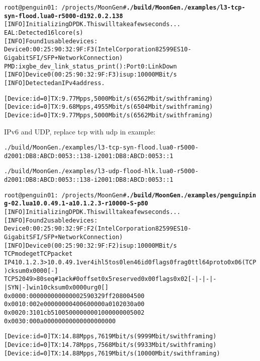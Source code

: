 \documentclass[Screen16to9,17pt]{foils}
\begin{document}
\begin{alltt}\footnotesize
root@penguin01:~/projects/MoonGen# {\bfseries ./build/MoonGen ./examples/l3-tcp-syn-flood.lua 0 -r 5000 -d 192.0.2.138}
[INFO]  Initializing DPDK. This will take a few seconds...
EAL: Detected 16 lcore(s)
[INFO]  Found 1 usable devices:
   Device 0: 00:25:90:32:9F:F3 (Intel Corporation 82599ES 10-Gigabit SFI/SFP+ Network Connection)
PMD: ixgbe_dev_link_status_print():  Port 0: Link Down
[INFO]  Device 0 (00:25:90:32:9F:F3) is up: 10000 MBit/s
[INFO]  Detected an IPv4 address.

[Device: id=0] TX: 9.77 Mpps, 5000 Mbit/s (6562 Mbit/s with framing)
[Device: id=0] TX: 9.68 Mpps, 4955 Mbit/s (6504 Mbit/s with framing)
[Device: id=0] TX: 9.77 Mpps, 5000 Mbit/s (6562 Mbit/s with framing)
\end{alltt}

IPv6 and UDP, replace tcp with udp in example:
\begin{alltt}\footnotesize
./build/MoonGen ./examples/l3-tcp-syn-flood.lua 0 -r 5000 -d 2001:DB8:ABCD:0053::138 -i 2001:DB8:ABCD:0053::1

./build/MoonGen ./examples/l3-udp-flood-hlk.lua 0 -r 5000 -d 2001:DB8:ABCD:0053::138 -i 2001:DB8:ABCD:0053::1
\end{alltt}



\begin{alltt}\footnotesize
root@penguin01:~/projects/MoonGen# {\bfseries ./build/MoonGen ./examples/penguinping-02.lua 10.0.49.1 -a 10.1.2.3 -r 10000 -S -p 80}
[INFO]  Initializing DPDK. This will take a few seconds...
[INFO]  Found 2 usable devices:
   Device 0: 00:25:90:32:9F:F2 (Intel Corporation 82599ES 10-Gigabit SFI/SFP+ Network Connection)
[INFO]  Device 0 (00:25:90:32:9F:F2) is up: 10000 MBit/s
TCP mode get TCP packet
IP4 10.1.2.3 > 10.0.49.1 ver 4 ihl 5 tos 0 len 46 id 0 flags 0 frag 0 ttl 64 proto 0x06 (TCP) cksum 0x0000 [-]
TCP 52049 > 80 seq# 1 ack# 0 offset 0x5 reserved 0x00 flags 0x02 [-|-|-|-|SYN|-] win 10 cksum 0x0000 urg 0 []
  0x0000:   0000 0000 0000 0025 9032 9ff2 0800 4500
  0x0010:   002e 0000 0000 4006 0000 0a01 0203 0a00
  0x0020:   3101 cb51 0050 0000 0001 0000 0000 5002
  0x0030:   000a 0000 0000 0000 0000 0000

[Device: id=0] TX: 14.88 Mpps, 7619 Mbit/s (9999 Mbit/s with framing)
[Device: id=0] TX: 14.78 Mpps, 7568 Mbit/s (9933 Mbit/s with framing)
[Device: id=0] TX: 14.88 Mpps, 7619 Mbit/s (10000 Mbit/s with framing)
\end{alltt}
\end{document}
